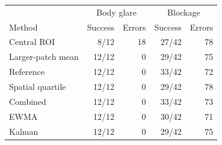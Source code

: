 \begin{tabular}{@{}lrrrr@{}}\toprule
& \multicolumn{2}{c}{Body glare} & \multicolumn{2}{c}{Blockage}\\
Method & Success & Errors & Success & Errors\\\midrule
Central ROI & 8/12 & 18 & 27/42 & 78\\
Larger-patch mean & 12/12 & 0 & 29/42 & 75\\
Reference & 12/12 & 0 & 33/42 & 72\\
Spatial quartile & 12/12 & 0 & 29/42 & 78\\
Combined & 12/12 & 0 & 33/42 & 73\\
EWMA & 12/12 & 0 & 30/42 & 71\\
Kalman & 12/12 & 0 & 29/42 & 75\\
\bottomrule\end{tabular}
